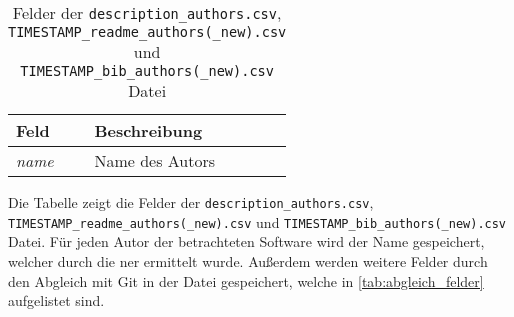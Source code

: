 \begin{table}
    \centering
    \setlength{\tabcolsep}{8pt}
    \begin{tabular}{p{3.5cm}|p{10cm}}
        \toprule
        \textbf{Feld} & \textbf{Beschreibung} \\ \midrule
        \emph{name} & Name des Autors \\
        \bottomrule
    \end{tabular}
    \caption{Felder der \texttt{description\_authors.csv}, \texttt{TIMESTAMP\_readme\_authors(\_new).csv} und \texttt{TIMESTAMP\_bib\_authors(\_new).csv} Datei}
    \label{tab:description_authors}
    \small
    Die Tabelle zeigt die Felder der \texttt{description\_authors.csv}, \texttt{TIMESTAMP\_readme\_authors(\_new).csv} und \texttt{TIMESTAMP\_bib\_authors(\_new).csv} Datei. Für jeden Autor der betrachteten Software wird der Name gespeichert, welcher durch die \gls{ner} ermittelt wurde. Außerdem werden weitere Felder durch den Abgleich mit Git in der Datei gespeichert, welche in \autoref{tab:abgleich_felder} aufgelistet sind.
\end{table}
